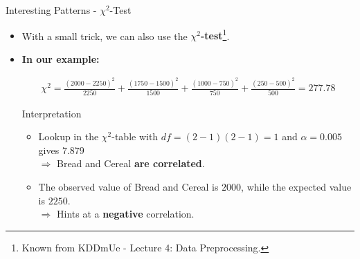 \begin{frame}{Interesting Patterns - $\chi^2$-Test}
	\begin{itemize}
		\item With a small trick, we can also use the \textbf{$\chi^2$-test}\footnote{Known from KDDmUe - Lecture 4: Data Preprocessing.}.
		\item \textbf{In our example:} \\
		      \begin{center}
		      \end{center}
		      \begin{align*}
			      \chi^2 = \frac{(2000-2250)^2}{2250} + \frac{(1750-1500)^2}{1500} +
			      \frac{(1000-750)^2}{750} + \frac{(250-500)^2}{500} = 277.78
		      \end{align*}

		      \vspace*{-0.1cm}

		      \begin{block}{Interpretation}
			      \begin{itemize}
				      \item Lookup in the $\chi^2$-table with $df=(2-1)(2-1)=1$ and $\alpha=0.005$ gives $7.879$ \\
				            $\Rightarrow$ Bread and Cereal \textbf{are correlated}.
				      \item The observed value of Bread and Cereal is $2000$, while the expected value is $2250$. \\
				            $\Rightarrow$ Hints at a \textbf{negative} correlation.
			      \end{itemize}
		      \end{block}
	\end{itemize}
\end{frame}

